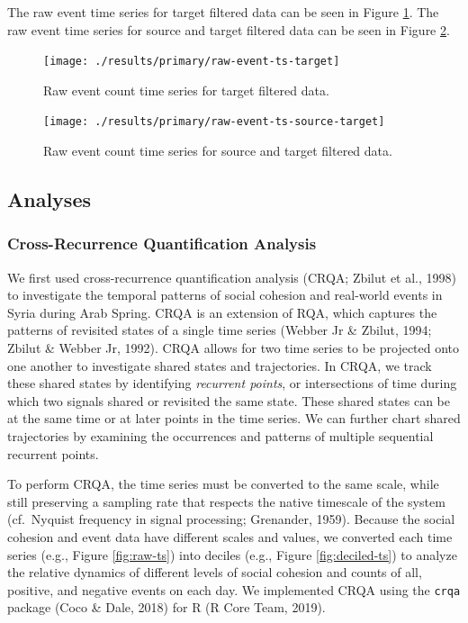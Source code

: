 \documentclass[english,man]{apa6}
\begin{document}
The raw event time series for target filtered data can be seen in Figure
\ref{fig:raw-event-ts-target}. The raw event time series for source and target
filtered data can be seen in Figure \ref{fig:raw-event-ts-source-target}.

\begin{figure}
\texttt{[image: ./results/primary/raw-event-ts-target]} \caption{Raw event count time series for target filtered data.}\label{fig:raw-event-ts-target}
\end{figure}

\begin{figure}
\texttt{[image: ./results/primary/raw-event-ts-source-target]} \caption{Raw event count time series for source and target filtered data.}\label{fig:raw-event-ts-source-target}
\end{figure}

\hypertarget{analyses}{%
\subsection{Analyses}\label{analyses}}

\hypertarget{cross-recurrence-quantification-analysis}{%
\subsubsection{Cross-Recurrence Quantification Analysis}\label{cross-recurrence-quantification-analysis}}

We first used cross-recurrence quantification analysis (CRQA; Zbilut et al., 1998) to investigate the temporal patterns of social cohesion
and real-world events in Syria during Arab Spring. CRQA is an extension of RQA,
which captures the patterns of revisited states of a single time series
(Webber Jr \& Zbilut, 1994; Zbilut \& Webber Jr, 1992). CRQA allows for two time series
to be projected onto one another to investigate shared states and trajectories.
In CRQA, we track these shared states by identifying \emph{recurrent points}, or
intersections of time during which two signals shared or revisited the same
state. These shared states can be at the same time or at later points in the
time series. We can further chart shared trajectories by examining the
occurrences and patterns of multiple sequential recurrent points.

To perform CRQA, the time series must be converted to the same scale, while
still preserving a sampling rate that respects the native timescale of the
system (cf.~Nyquist frequency in signal processing; Grenander, 1959).
Because the social cohesion and event data have different scales and values, we
converted each time series (e.g., Figure \ref{fig:raw-ts}) into deciles (e.g.,
Figure \ref{fig:deciled-ts}) to analyze the relative dynamics of different
levels of social cohesion and counts of all, positive, and negative events on
each day. We implemented CRQA using the \texttt{crqa} package (Coco \& Dale, 2018) for R
(R Core Team, 2019).
\end{document}
